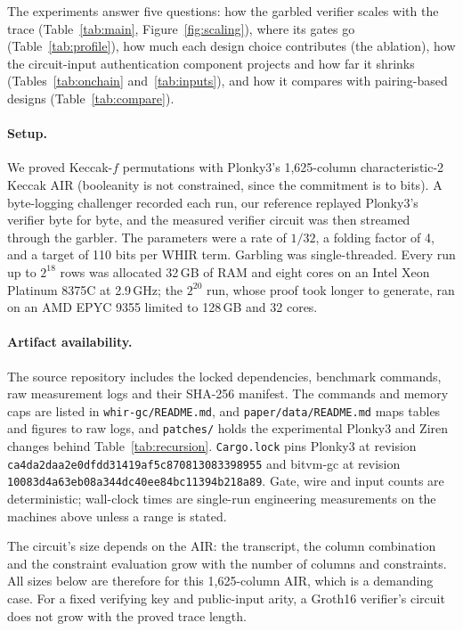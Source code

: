 \documentclass[11pt]{article}
\begin{document}
The experiments answer five questions: how the garbled verifier scales with the
trace (Table~\ref{tab:main}, Figure~\ref{fig:scaling}), where its gates go
(Table~\ref{tab:profile}), how much each design choice contributes (the
ablation), how the circuit-input authentication component projects and how far it shrinks
(Tables~\ref{tab:onchain} and~\ref{tab:inputs}), and how it compares with
pairing-based designs (Table~\ref{tab:compare}).

\paragraph{Setup.} We proved Keccak-$f$ permutations with Plonky3's
1{,}625-column characteristic-2 Keccak AIR (booleanity is not constrained,
since the commitment is to bits). A byte-logging challenger recorded each run,
our reference replayed Plonky3's verifier byte for byte, and the measured
verifier circuit was then streamed through the garbler. The parameters were a
rate of $1/32$, a folding factor of 4, and a target of 110 bits per WHIR term.
Garbling was single-threaded. Every run up to $2^{18}$ rows was allocated
32\,GB of RAM and eight cores on an Intel Xeon Platinum
8375C at 2.9\,GHz; the $2^{20}$ run, whose proof took longer to generate, ran on
an AMD EPYC 9355 limited to 128\,GB and 32 cores.

\paragraph{Artifact availability.} The source repository includes the locked
dependencies, benchmark commands, raw measurement logs and their SHA-256
manifest. The commands and memory caps are listed in
\texttt{whir-gc/README.md}, and \texttt{paper/data/README.md} maps tables and
figures to raw logs, and \texttt{patches/} holds the experimental Plonky3 and
Ziren changes behind Table~\ref{tab:recursion}. \texttt{Cargo.lock} pins Plonky3 at revision
\texttt{ca4da2daa2e0dfdd31419af5c870813083398955} and bitvm-gc at revision
\texttt{10083d4a63eb08a344dc40ee84bc11394b218a89}. Gate, wire and input counts
are deterministic; wall-clock times are single-run engineering measurements
on the machines above unless a range is stated.

The circuit's size depends on the AIR: the transcript, the column combination
and the constraint evaluation grow with the number of columns and constraints.
All sizes below are therefore for this 1{,}625-column AIR, which is a demanding
case. For a fixed verifying key and public-input arity, a Groth16 verifier's
circuit does not grow with the proved trace length.
\end{document}
